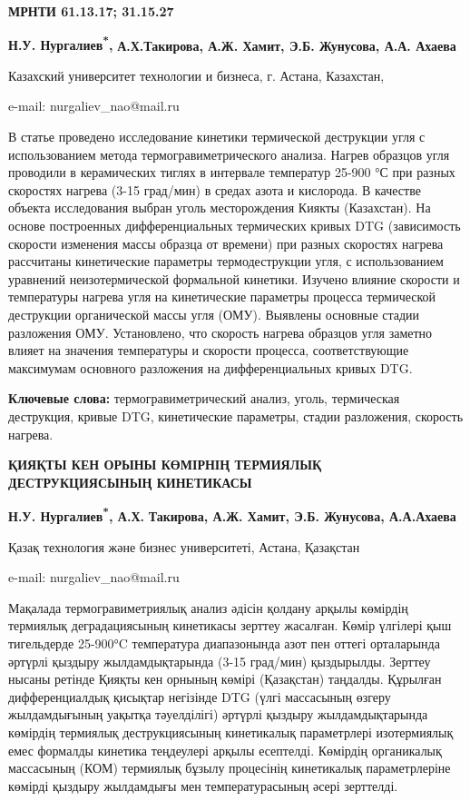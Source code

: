 \clearpage
{\bfseries МРНТИ 61.13.17; 31.15.27}


\begin{center}
{\bfseries Н.У. Нургалиев\textsuperscript{*},} {\bfseries А.Х.Такирова, А.Ж.
Хамит, Э.Б. Жунусова, А.А. Ахаева}

Казахский университет технологии и бизнеса, г. Астана, Казахстан,

e-mail: nurgaliev\_nao@mail.ru
\end{center}

В статье проведено исследование кинетики термической деструкции угля с
использованием метода термогравиметрического анализа. Нагрев образцов
угля проводили в керамических тиглях в интервале температур 25-900 °С
при разных скоростях нагрева (3-15 град/мин) в средах азота и кислорода.
В качестве объекта исследования выбран уголь месторождения Киякты
(Казахстан). На основе построенных дифференциальных термических кривых
DTG (зависимость скорости изменения массы образца от времени) при разных
скоростях нагрева рассчитаны кинетические параметры термодеструкции
угля, с использованием уравнений неизотермической формальной кинетики.
Изучено влияние скорости и температуры нагрева угля на кинетические
параметры процесса термической деструкции органической массы угля (ОМУ).
Выявлены основные стадии разложения ОМУ. Установлено, что скорость
нагрева образцов угля заметно влияет на значения температуры и скорости
процесса, соответствующие максимумам основного разложения на
дифференциальных кривых DTG.

{\bfseries Ключевые слова:} термогравиметрический анализ, уголь,
термическая деструкция, кривые DTG, кинетические параметры, стадии
разложения, скорость нагрева.

\begin{center}
{\large\bfseries ҚИЯҚТЫ КЕН ОРЫНЫ КӨМІРНІҢ ТЕРМИЯЛЫҚ ДЕСТРУКЦИЯСЫНЫҢ КИНЕТИКАСЫ}

\vspace{1em}
{\bfseries Н.У. Нургалиев\textsuperscript{*}, А.Х.} {\bfseries Такирова, А.Ж.
Хамит, Э.Б. Жунусова, А.А.Ахаева}

Қазақ технология және бизнес университеті, Астана, Қазақстан

e-mail: nurgaliev\_nao@mail.ru
\end{center}

Мақалада термогравиметриялық анализ әдісін қолдану арқылы көмірдің
термиялық деградациясының кинетикасы зерттеу жасалған. Көмір үлгілері
қыш тигельдерде 25-900°C температура диапазонында азот пен оттегі
орталарында әртүрлі қыздыру жылдамдықтарында (3-15 град/мин)
қыздырылды. Зерттеу нысаны ретінде Қияқты кен орнының көмірі (Қазақстан)
таңдалды. Құрылған дифференциалдық қисықтар негізінде DTG (үлгі
массасының өзгеру жылдамдығының уақытқа тәуелділігі) әртүрлі қыздыру
жылдамдықтарында көмірдің термиялық деструкциясының кинетикалық
параметрлері изотермиялық емес формалды кинетика теңдеулері арқылы
есептелді. Көмірдің органикалық массасының (КОМ) термиялық бұзылу
процесінің кинетикалық параметрлеріне көмірді қыздыру жылдамдығы мен
температурасының әсері зерттелді.

